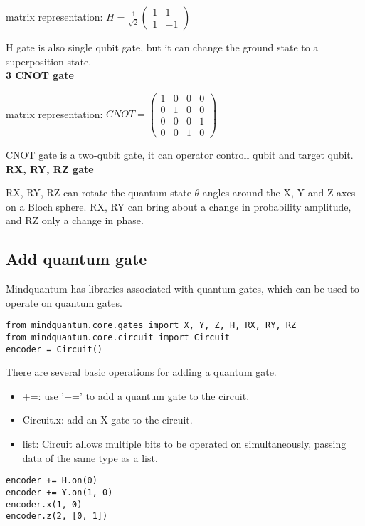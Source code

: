 matrix representation: $H = \frac{1}{\sqrt{2}} \left( \begin{array}{cc}
     1 & 1 \\
     1 & -1 
\end{array} \right)$  

H gate is also single qubit gate, but it can change the ground state to a superposition state. \\

\textbf{3 CNOT gate}

matrix representation: $CNOT = \left( \begin{array}{cccc}
     1 & 0 & 0 & 0 \\
     0 & 1 & 0 & 0 \\
     0 & 0 & 0 & 1 \\
     0 & 0 & 1 & 0
\end{array} \right)$  

CNOT gate is a two-qubit gate, it can operator controll qubit and target qubit. \\

\textbf{RX, RY, RZ gate}

RX, RY, RZ can rotate the quantum state $\theta$ angles around the X, Y and Z axes on a Bloch sphere. RX, RY can bring about a change in probability amplitude, and RZ only a change in phase.
\subsection{Add quantum gate}
Mindquantum has libraries associated with quantum gates, which can be used to operate on quantum gates. 
\begin{lstlisting}
from mindquantum.core.gates import X, Y, Z, H, RX, RY, RZ
from mindquantum.core.circuit import Circuit
encoder = Circuit()
\end{lstlisting}

There are several basic operations for adding a quantum gate.
\begin{itemize}
    \item +=: use '+=' to add a quantum gate to the circuit.
    \item Circuit.x: add an X gate to the circuit.
    \item list: Circuit allows multiple bits to be operated on simultaneously, passing data of the same type as a list.  
\end{itemize}
\begin{lstlisting}
encoder += H.on(0) 
encoder += Y.on(1, 0)
encoder.x(1, 0)
encoder.z(2, [0, 1])        
\end{lstlisting}
